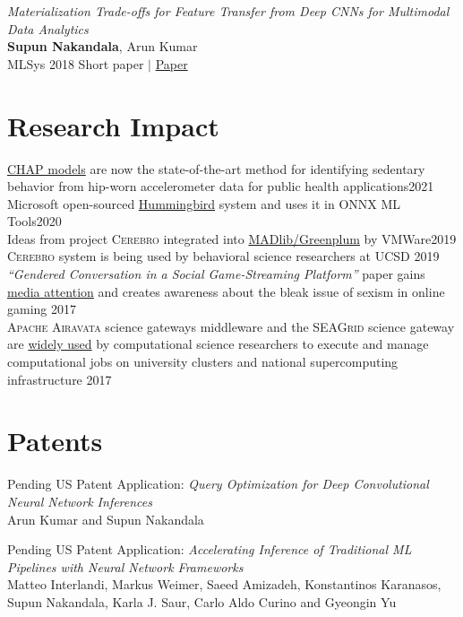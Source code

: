 \documentclass[margin]{res}
\begin{document}
\begin{resume}
\par
\textit{Materialization Trade-offs for Feature Transfer from Deep CNNs for Multimodal Data Analytics} \\
\textbf{Supun Nakandala}, Arun Kumar\\
MLSys 2018 Short paper $|$ \href{https://adalabucsd.github.io/papers/2018_Vista_SysML.pdf}{Paper}



\section{Research Impact}
\href{https://github.com/adalabucsd/DeepPostures}{CHAP models} are now the state-of-the-art method for identifying sedentary behavior from hip-worn accelerometer data for public health applications\hfill 2021\\
Microsoft open-sourced \href{https://github.com/microsoft/hummingbird}{Hummingbird} system and uses it in ONNX ML Tools\hfill 2020\\
Ideas from project \textsc{Cerebro} integrated into \href{https://tanzu.vmware.com/content/blog/model-selection-for-deep-neural-networks-on-greenplum-database}{MADlib/Greenplum} by VMWare\hfill 2019\\
\textsc{Cerebro} system is being used by behavioral science researchers at UCSD \hfill 2019\\
\textit{``Gendered Conversation in a Social Game-Streaming Platform''} paper gains \href{https://docs.google.com/document/d/12zybT3kJb1JaW3c8oSx3hdH4g21MlkHA56C5_mkY_6I/edit?usp=sharing}{media attention} and creates awareness about the bleak issue of sexism in online gaming \hfill 2017\\
\textsc{Apache Airavata} science gateways middleware and the \textsc{SEAGrid} science gateway are \href{https://seagrid.org/publications/}{widely used} by computational science researchers to execute and manage computational jobs on university clusters and national supercomputing infrastructure \hfill 2017


\section{Patents}
\par
Pending US Patent Application: \textit{Query Optimization for Deep Convolutional Neural Network Inferences}\\
Arun Kumar and Supun Nakandala

\par
Pending US Patent Application: \textit{Accelerating Inference of Traditional ML Pipelines with Neural Network Frameworks}\\
Matteo Interlandi, Markus Weimer, Saeed Amizadeh, Konstantinos Karanasos,
Supun Nakandala, Karla J. Saur, Carlo Aldo Curino and Gyeongin Yu



\end{resume}
\end{document}
